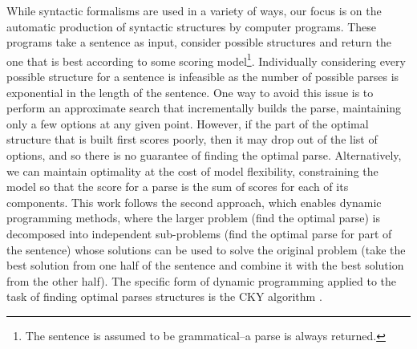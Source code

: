 
While syntactic formalisms are used in a variety of ways, our focus is on the automatic production of syntactic structures by computer programs.
These programs take a sentence as input, consider possible structures and return the one that is best according to some scoring model\footnote{The sentence is assumed to be grammatical--a parse is always returned.}.
Individually considering every possible structure for a sentence is infeasible as the number of possible parses is exponential in the length of the sentence.
One way to avoid this issue is to perform an approximate search that incrementally builds the parse, maintaining only a few options at any given point.
However, if the part of the optimal structure that is built first scores poorly, then it may drop out of the list of options, and so there is no guarantee of finding the optimal parse.
Alternatively, we can maintain optimality at the cost of model flexibility, constraining the model so that the score for a parse is the sum of scores for each of its components.
This work follows the second approach, which enables dynamic programming methods, where the larger problem (find the optimal parse) is decomposed into independent sub-problems (find the optimal parse for part of the sentence) whose solutions can be used to solve the original problem (take the best solution from one half of the sentence and combine it with the best solution from the other half).
The specific form of dynamic programming applied to the task of finding optimal parses structures is the CKY algorithm \parencite{Cocke:1969,Kasami:1966,Younger:1967}.

